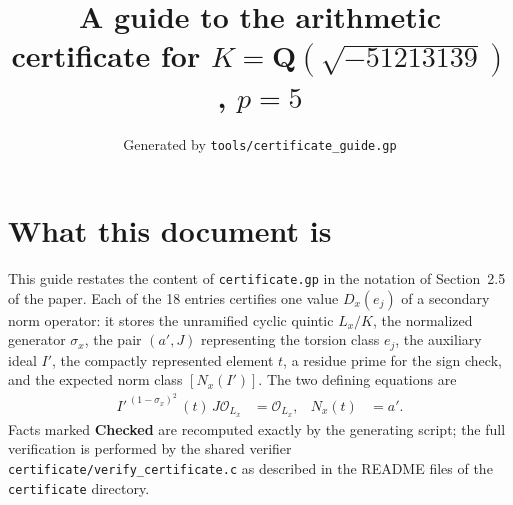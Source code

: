 \documentclass[11pt]{article}
\title{A guide to the arithmetic certificate for $K=\mathbf Q(\sqrt{-51213139})$, $p=5$}
\author{}
\date{Generated by \texttt{tools/certificate\_guide.gp}}
\begin{document}
\maketitle
\section*{What this document is}
This guide restates the content of \texttt{certificate.gp} in the
notation of Section~2.5 of the paper.  Each of the 18 entries
certifies one value $D_x(e_j)$ of a secondary norm operator: it
stores the unramified cyclic quintic $L_x/K$, the normalized
generator $\sigma_x$, the pair $(a',J)$ representing the torsion
class $e_j$, the auxiliary ideal $I'$, the compactly represented
element $t$, a residue prime for the sign check, and the expected
norm class $[N_x(I')]$.  The two defining equations are
\begin{align*}
I'^{\,(1-\sigma_x)^2}\,(t)\,J\mathcal O_{L_x}&=\mathcal O_{L_x},&
N_x(t)&=a'.
\end{align*}
Facts marked \textbf{Checked} are recomputed exactly by the
generating script; the full verification is performed by the
shared verifier \texttt{certificate/verify\_certificate.c} as
described in the README files of the \texttt{certificate}
directory.
\end{document}
